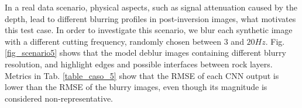 \documentclass[conference]{IEEEtran}
\begin{document}
In a real data scenario, physical aspects, such as signal attenuation caused by the depth, lead to
different blurring profiles in post-inversion images, what motivates this test case.
In order to investigate this scenario, we blur each synthetic image with a different
cutting frequency, randomly chosen between $3$ and $20 Hz$. 
Fig. \ref{fig_scenario5} shows that the model deblur images containing different blurry resolution, and
highlight edges and possible interfaces between rock layers. Metrics in Tab. \ref{table_caso_5} show that the RMSE
of each CNN output is lower than the RMSE of the blurry images, even though its magnitude is considered non-representative.
\begin{figure}[!t]
\centering
{}

\end{figure}
\end{document}
